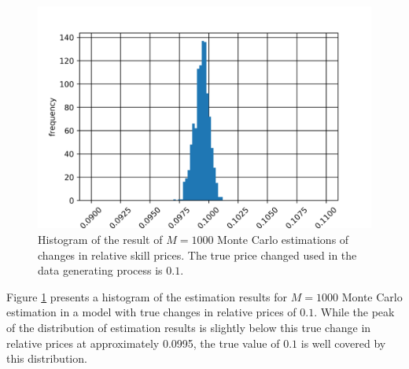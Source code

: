 \documentclass[../main.tex]{subfiles}
\begin{document}
\begin{figure}[!htbp]
	\centering
	\includegraphics[scale=0.75]{../FIG/MC_estimation_rslt.png} 
	\caption{Histogram of the result of $M=1000$ Monte Carlo estimations of changes in relative skill prices. The true price changed used in the data generating process is $0.1$.}
	\label{fig:MC_est_rslt}
\end{figure}
Figure \ref{fig:MC_est_rslt} presents a histogram of the estimation results for $M=1000$ Monte Carlo estimation in a model with true changes in relative prices of $0.1$. While the peak of the distribution of estimation results is slightly below this true change in relative prices at approximately 0.0995, the true value of $0.1$ is well covered by this distribution.
\end{document}
